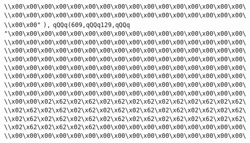 \verb|\\x00\x00\x00\x00\x00\x00\x00\x00\x00\x00\x00\x00\x00\x00\x00\x00\|\newline
\verb|\\x00\x00\x00\x00\x00\x00\x00\x00\x00\x00\x00\x00\x00\x00\x00\x00\|\newline
\verb|\\x00\x00"|\newline
\verb|),|\newline
\verb|qQQq(609,qQQq129,qQQq|\newline
\verb|"\x00\x00\x00\x00\x00\x00\x00\x00\x00\x00\x00\x00\x00\x00\x00\x00\|\newline
\verb|\\x00\x00\x00\x00\x00\x00\x00\x00\x00\x00\x00\x00\x00\x00\x00\x00\|\newline
\verb|\\x00\x00\x00\x00\x00\x00\x00\x00\x00\x00\x00\x00\x00\x00\x00\x00\|\newline
\verb|\\x00\x00\x00\x00\x00\x00\x00\x00\x00\x00\x00\x00\x00\x00\x00\x00\|\newline
\verb|\\x00\x00\x00\x00\x00\x00\x00\x00\x00\x00\x00\x00\x00\x00\x00\x00\|\newline
\verb|\\x00\x00\x00\x00\x00\x00\x00\x00\x00\x00\x00\x00\x00\x00\x00\x00\|\newline
\verb|\\x00\x00\x00\x00\x00\x00\x00\x00\x00\x00\x00\x00\x00\x00\x00\x00\|\newline
\verb|\\x00\x00\x00\x00\x00\x00\x00\x00\x00\x00\x00\x00\x00\x00\x00\x00\|\newline
\verb|\\x00\x00\x02\x62\x02\x62\x02\x62\x02\x62\x02\x62\x02\x62\x02\x62\|\newline
\verb|\\x02\x62\x02\x62\x02\x62\x02\x62\x02\x62\x02\x62\x02\x62\x02\x62\|\newline
\verb|\\x02\x62\x02\x62\x02\x62\x02\x62\x02\x62\x02\x62\x02\x62\x02\x62\|\newline
\verb|\\x02\x62\x02\x62\x02\x62\x00\x00\x00\x00\x00\x00\x00\x00\x00\x00\|\newline
\verb|\\x00\x00\x00\x00\x00\x00\x00\x00\x00\x00\x00\x00\x00\x00\x00\x00\|\newline

